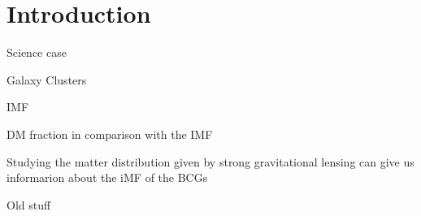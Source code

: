 \chapter{Introduction}

Science case

Galaxy Clusters

IMF

DM fraction in comparison with the IMF 

Studying the matter distribution given by strong gravitational lensing can give us informarion about the iMF of the BCGs

Old stuff

\newpage
